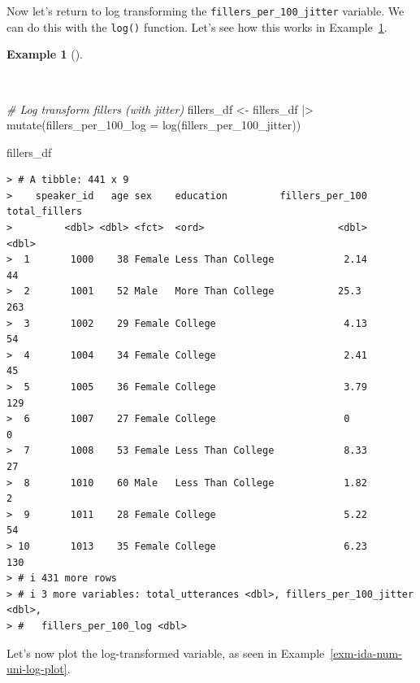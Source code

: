 \documentclass[
  letterpaper,
  DIV=11,
  numbers=noendperiod]{scrreprt}
\newenvironment{Shaded}{\begin{snugshade}}{\end{snugshade}}
\newcommand{\AttributeTok}[1]{\textcolor[rgb]{0.00,0.00,0.00}{#1}}
\newcommand{\CommentTok}[1]{\textcolor[rgb]{0.00,0.00,0.00}{\textit{#1}}}
\newcommand{\FunctionTok}[1]{\textcolor[rgb]{0.00,0.00,0.00}{#1}}
\newcommand{\NormalTok}[1]{\textcolor[rgb]{0.00,0.00,0.00}{#1}}
\newcommand{\OtherTok}[1]{\textcolor[rgb]{0.00,0.00,0.00}{#1}}
\newcommand{\SpecialCharTok}[1]{\textcolor[rgb]{0.00,0.00,0.00}{#1}}
\theoremstyle{definition}
\newtheorem{example}{Example}[chapter]
\theoremstyle{remark}
\begin{document}
Now let's return to log transforming the
\texttt{fillers\_per\_100\_jitter} variable. We can do this with the
\texttt{log()} function. Let's see how this works in
Example~\ref{exm-ida-num-uni-log}.

\begin{example}[]\protect\hypertarget{exm-ida-num-uni-log}{}\label{exm-ida-num-uni-log}

~

\begin{Shaded}
\begin{Highlighting}[]
\CommentTok{\# Log transform fillers (with jitter)}
\NormalTok{fillers\_df }\OtherTok{\textless{}{-}}
\NormalTok{  fillers\_df }\SpecialCharTok{|\textgreater{}}
  \FunctionTok{mutate}\NormalTok{(}\AttributeTok{fillers\_per\_100\_log =} \FunctionTok{log}\NormalTok{(fillers\_per\_100\_jitter))}

\NormalTok{fillers\_df}
\end{Highlighting}
\end{Shaded}

\begin{verbatim}
> # A tibble: 441 x 9
>    speaker_id   age sex    education         fillers_per_100 total_fillers
>         <dbl> <dbl> <fct>  <ord>                       <dbl>         <dbl>
>  1       1000    38 Female Less Than College            2.14            44
>  2       1001    52 Male   More Than College           25.3            263
>  3       1002    29 Female College                      4.13            54
>  4       1004    34 Female College                      2.41            45
>  5       1005    36 Female College                      3.79           129
>  6       1007    27 Female College                      0                0
>  7       1008    53 Female Less Than College            8.33            27
>  8       1010    60 Male   Less Than College            1.82             2
>  9       1011    28 Female College                      5.22            54
> 10       1013    35 Female College                      6.23           130
> # i 431 more rows
> # i 3 more variables: total_utterances <dbl>, fillers_per_100_jitter <dbl>,
> #   fillers_per_100_log <dbl>
\end{verbatim}

\end{example}

Let's now plot the log-transformed variable, as seen in
Example~\ref{exm-ida-num-uni-log-plot}.
\end{document}
